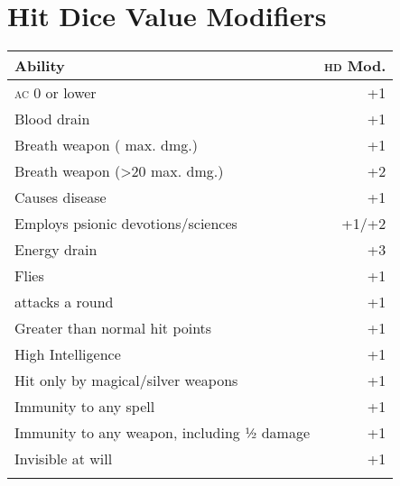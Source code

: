 \documentclass[10pt,letterpaper]{article}
\newcommand{\AC}[0]{{\scshape ac}}
\newcommand{\HD}[0]{{\scshape hd}}
\begin{document}
\section*{Hit Dice Value Modifiers}
\begin{minipage}[t]{0.495\textwidth}
  \begin{tabularx}{\textwidth}{Xr}
    \toprule
    Ability & \HD{} Mod. \\
    \midrule
    \AC{} 0 or lower & +1 \\
    Blood drain & +1 \\
    Breath weapon (\le20 max. dmg.) & +1 \\
    Breath weapon (>20 max. dmg.) & +2 \\
    Causes disease & +1 \\
    Employs psionic devotions/sciences & +1/+2 \\
    Energy drain & +3 \\
    Flies & +1 \\
    \ge4 attacks a round & +1 \\
    Greater than normal hit points & +1 \\
    High Intelligence & +1 \\
    Hit only by magical/silver weapons & +1 \\
    Immunity to any spell & +1 \\
    Immunity to any weapon, including ½ damage & +1 \\
    Invisible at will & +1 \\
    & \\
    \bottomrule
  \end{tabularx}
\end{minipage}\hfill
\end{document}
